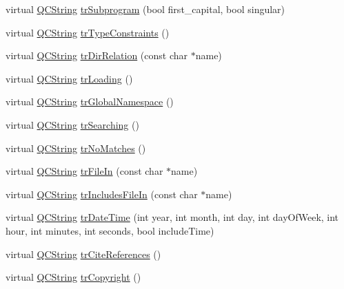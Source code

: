 \begin{DoxyCompactItemize}
virtual \mbox{\hyperlink{class_q_c_string}{Q\+C\+String}} \mbox{\hyperlink{class_translator_portuguese_aabd1229a0c0c935ba7703e0e52ac303a}{tr\+Subprogram}} (bool first\+\_\+capital, bool singular)
\item 
virtual \mbox{\hyperlink{class_q_c_string}{Q\+C\+String}} \mbox{\hyperlink{class_translator_portuguese_ac03a91700d218a5b76c0af6743dd3e08}{tr\+Type\+Constraints}} ()
\item 
virtual \mbox{\hyperlink{class_q_c_string}{Q\+C\+String}} \mbox{\hyperlink{class_translator_portuguese_a89df3c9ffb220e05e00e82bea17f0989}{tr\+Dir\+Relation}} (const char $\ast$name)
\item 
virtual \mbox{\hyperlink{class_q_c_string}{Q\+C\+String}} \mbox{\hyperlink{class_translator_portuguese_a969861b44113a334578a909ecd8ee931}{tr\+Loading}} ()
\item 
virtual \mbox{\hyperlink{class_q_c_string}{Q\+C\+String}} \mbox{\hyperlink{class_translator_portuguese_a28493020b30f93c87c291b6e6d2c3cc1}{tr\+Global\+Namespace}} ()
\item 
virtual \mbox{\hyperlink{class_q_c_string}{Q\+C\+String}} \mbox{\hyperlink{class_translator_portuguese_ac32d98dbe9331829953f07bfd3d4f3c4}{tr\+Searching}} ()
\item 
virtual \mbox{\hyperlink{class_q_c_string}{Q\+C\+String}} \mbox{\hyperlink{class_translator_portuguese_a44239ac2f452efa7ceacd54f5e4beddb}{tr\+No\+Matches}} ()
\item 
virtual \mbox{\hyperlink{class_q_c_string}{Q\+C\+String}} \mbox{\hyperlink{class_translator_portuguese_a90125a340ab8e625479c613d086624ed}{tr\+File\+In}} (const char $\ast$name)
\item 
virtual \mbox{\hyperlink{class_q_c_string}{Q\+C\+String}} \mbox{\hyperlink{class_translator_portuguese_a59aadd4aa0ee665711eff9a0bad836d3}{tr\+Includes\+File\+In}} (const char $\ast$name)
\item 
virtual \mbox{\hyperlink{class_q_c_string}{Q\+C\+String}} \mbox{\hyperlink{class_translator_portuguese_a361ab969f387e33f0204d8398571d2b3}{tr\+Date\+Time}} (int year, int month, int day, int day\+Of\+Week, int hour, int minutes, int seconds, bool include\+Time)
\item 
virtual \mbox{\hyperlink{class_q_c_string}{Q\+C\+String}} \mbox{\hyperlink{class_translator_portuguese_a377d557bb30de849b54ca7a195446dff}{tr\+Cite\+References}} ()
\item 
virtual \mbox{\hyperlink{class_q_c_string}{Q\+C\+String}} \mbox{\hyperlink{class_translator_portuguese_ae66f14fe2d14041e1e32f2dd82be48ed}{tr\+Copyright}} ()

\end{DoxyCompactItemize}
